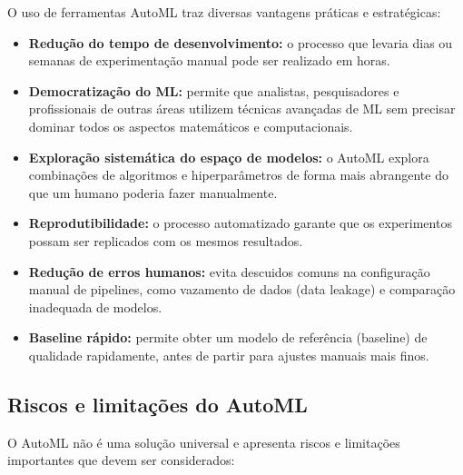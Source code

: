 \documentclass[11pt, a4paper, oneside]{article}
\begin{document}
O uso de ferramentas AutoML traz diversas vantagens práticas e estratégicas:

\begin{itemize}[leftmargin=1.5cm, itemsep=4pt]
  \item \textbf{Redução do tempo de desenvolvimento:} o processo que levaria dias ou semanas de experimentação manual pode ser realizado em horas.
  \item \textbf{Democratização do ML:} permite que analistas, pesquisadores e profissionais de outras áreas utilizem técnicas avançadas de ML sem precisar dominar todos os aspectos matemáticos e computacionais.
  \item \textbf{Exploração sistemática do espaço de modelos:} o AutoML explora combinações de algoritmos e hiperparâmetros de forma mais abrangente do que um humano poderia fazer manualmente.
  \item \textbf{Reprodutibilidade:} o processo automatizado garante que os experimentos possam ser replicados com os mesmos resultados.
  \item \textbf{Redução de erros humanos:} evita descuidos comuns na configuração manual de pipelines, como vazamento de dados (data leakage) e comparação inadequada de modelos.
  \item \textbf{Baseline rápido:} permite obter um modelo de referência (baseline) de qualidade rapidamente, antes de partir para ajustes manuais mais finos.
\end{itemize}

\subsection{Riscos e limitações do AutoML}
\label{sec:riscos}

O AutoML não é uma solução universal e apresenta riscos e limitações importantes que
devem ser considerados:
\end{document}
